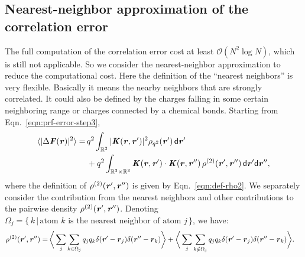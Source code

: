 \documentclass[aps,pre,preprint,unsortedaddress]{revtex4}
\renewcommand{\v}[1]{\textbf{\textit{#1}}}
\renewcommand{\d}[1]{\textsf{#1}}
\begin{document}
\subsection{Nearest-neighbor approximation of the correlation
error}
The full computation of the correlation error cost at least $\mathcal
O(N^2\log N)$, which is still not applicable.
So we consider the nearest-neighbor approximation to reduce
the computational cost.
Here the definition of the ``nearest neighbors'' is
very flexible. Basically it means the nearby neighbors that are
strongly correlated. It could also be defined by the charges falling in some
certain neighboring range or charges connected by a chemical bonds.
Starting from Eqn.~\eqref{eqn:prf-error-step3},
\begin{align} \nonumber
  \langle\vert\Delta\v F(\v r)\vert^2\rangle
  =\,&
  q^2\int_{\mathbb R^3}
  \vert\v K(\v r , \v r')\vert^2\rho_{q^2}(\v r')\,\d d\v r'
  \\
  & +
  q^2\int_{\mathbb R^3\times\mathbb R^3}
  \v K(\v r , \v r')\cdot\v K(\v r , \v r'')\,
  \rho^{(2)}(\v r', \v r'')
  \,\d d\v r'\d d\v r'',
\end{align}
where the definition of $\rho^{(2)}(\v r', \v r'')$ is given by
Eqn.~\eqref{eqn:def-rho2}.
We separately consider the  contribution from the nearest neighbors
and other contributions to
the pairwise density $\rho^{(2)}(\v r', \v r'')$.  Denoting
$\Omega_j = \{ \,k\,\vert\,
\textrm{atom $k$ is the nearest neighbor of atom $j$} \,\}$,
we have:
\begin{align}\label{eqn:split-rho-q2}
  \rho^{(2)}(\v r', \v r'')
  = &\,
  \bigg\langle
  \sum_j\sum_{k\in\Omega_j}q_j q_k\delta(\v r' - \v r_j)\delta(\v r'' - \v r_k)
  \bigg\rangle
  +
  \bigg\langle
  \sum_j\sum_{k\notin\Omega_j}q_j q_k\delta(\v r' - \v r_j)\delta(\v r'' - \v r_k)
  \bigg\rangle.
\end{align}
\end{document}
